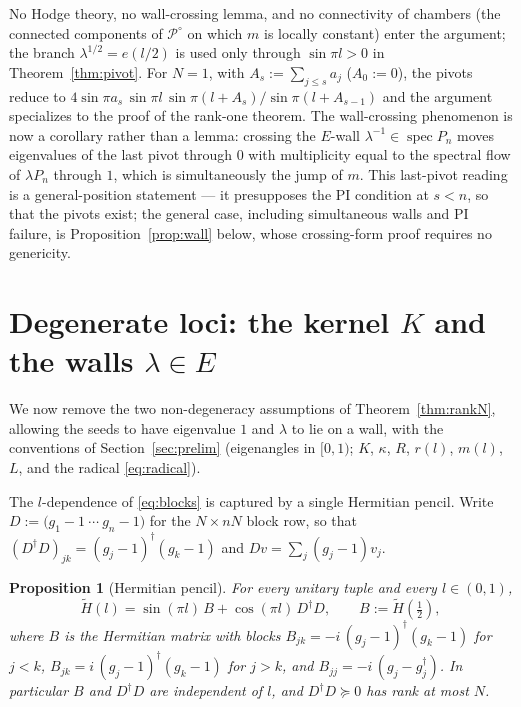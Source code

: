 \documentclass[11pt]{article}
\newtheorem{proposition}[theorem]{Proposition}
\theoremstyle{definition}
\newcommand{\Ht}{\widetilde H}
\begin{document}
\medskip
No Hodge theory, no wall-crossing lemma, and no connectivity of
chambers (the connected components of $\mathcal P^{\circ}$ on which
$m$ is locally constant) enter the argument; the branch $\lambda^{1/2}=e(l/2)$ is used only through
$\sin\pi l>0$ in Theorem~\ref{thm:pivot}. For $N=1$, with $A_s:=\sum_{j\le s}a_j$ ($A_0:=0$), the pivots reduce to
$4\sin\pi a_s\,\sin\pi l\,\sin\pi(l+A_s)/\sin\pi(l+A_{s-1})$ and the
argument specializes to the proof of the rank-one theorem. %
The
wall-crossing phenomenon is now a corollary rather than a lemma: crossing
the $E$-wall $\lambda^{-1}\in\operatorname{spec}P_n$ moves eigenvalues of
the last pivot through $0$ with multiplicity equal to the spectral flow of
$\lambda P_n$ through $1$, which is simultaneously the jump of $m$. This
last-pivot reading is a general-position statement --- it presupposes the
PI condition at $s<n$, so that the pivots exist; the general case,
including simultaneous walls and PI failure, is
Proposition~\ref{prop:wall} below, whose crossing-form proof requires no
genericity.

\section{Degenerate loci: the kernel $K$ and the walls $\lambda\in E$}
\label{sec:degenerate}
\label{subsec:degenerate}
We now remove the two non-degeneracy assumptions of
Theorem~\ref{thm:rankN}, allowing the seeds to have eigenvalue $1$ and
$\lambda$ to lie on a wall, with the conventions of
Section~\ref{sec:prelim} (eigenangles in $[0,1)$; $K$, $\kappa$,
$R$, $r(l)$, $m(l)$, $L$, and the radical \eqref{eq:radical}).

The $l$-dependence of \eqref{eq:blocks} is captured by a single
Hermitian pencil. Write $D:=\bigl(g_1-1\ \cdots\ g_n-1\bigr)$ for the
$N\times nN$ block row, so that $(D^{\dagger}D)_{jk}=(g_j-1)^{\dagger}(g_k-1)$
and $Dv=\sum_j(g_j-1)v_j$.

\begin{proposition}[Hermitian pencil]\label{prop:pencil}
For every unitary tuple and every $l\in(0,1)$,
\begin{equation}\label{eq:pencil}
\Ht(l)=\sin(\pi l)\,B+\cos(\pi l)\,D^{\dagger}D,
\qquad B:=\Ht(\tfrac12),
\end{equation}
where $B$ is the Hermitian matrix with blocks
$B_{jk}=-i\,(g_j-1)^{\dagger}(g_k-1)$ for $j<k$,
$B_{jk}=i\,(g_j-1)^{\dagger}(g_k-1)$ for $j>k$, and
$B_{jj}=-i\,(g_j-g_j^{\dagger})$. In particular $B$ and $D^{\dagger}D$
are independent of $l$, and $D^{\dagger}D\succeq0$ has rank at most $N$.
\end{proposition}
\end{document}
